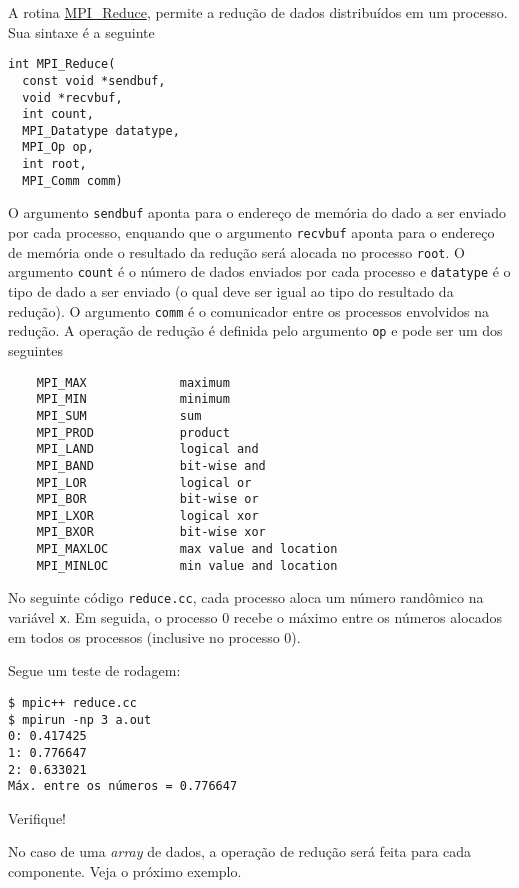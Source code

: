 A rotina \href{https://www.open-mpi.org/doc/current/man3/MPI_Reduce.3.php}{MPI\_Reduce}, permite a redução de dados distribuídos em um processo. Sua sintaxe é a seguinte
\begin{verbatim}
int MPI_Reduce(
  const void *sendbuf, 
  void *recvbuf, 
  int count,
  MPI_Datatype datatype, 
  MPI_Op op, 
  int root,
  MPI_Comm comm)
\end{verbatim}
O argumento \verb+sendbuf+ aponta para o endereço de memória do dado a ser enviado por cada processo, enquando que o argumento \verb+recvbuf+ aponta para o endereço de memória onde o resultado da redução será alocada no processo \verb+root+. O argumento \verb+count+ é o número de dados enviados por cada processo e \verb+datatype+ é o tipo de dado a ser enviado (o qual deve ser igual ao tipo do resultado da redução). O argumento \verb+comm+ é o comunicador entre os processos envolvidos na redução. A operação de redução é definida pelo argumento \verb+op+ e pode ser um dos seguintes
\begin{verbatim}
    MPI_MAX             maximum
    MPI_MIN             minimum
    MPI_SUM             sum
    MPI_PROD            product
    MPI_LAND            logical and
    MPI_BAND            bit-wise and
    MPI_LOR             logical or
    MPI_BOR             bit-wise or
    MPI_LXOR            logical xor
    MPI_BXOR            bit-wise xor
    MPI_MAXLOC          max value and location
    MPI_MINLOC          min value and location
\end{verbatim}

\begin{ex}
  No seguinte código \verb+reduce.cc+, cada processo aloca um número randômico na variável \verb+x+. Em seguida, o processo $0$ recebe o máximo entre os números alocados em todos os processos (inclusive no processo 0).
  
  

  Segue um teste de rodagem:
\begin{verbatim}
$ mpic++ reduce.cc
$ mpirun -np 3 a.out                                                           
0: 0.417425
1: 0.776647
2: 0.633021
Máx. entre os números = 0.776647
\end{verbatim}
  Verifique!
\end{ex}

No caso de uma {\it array} de dados, a operação de redução será feita para cada componente. Veja o próximo exemplo.

